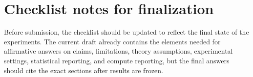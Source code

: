 \documentclass{article}
\begin{document}
\section{Checklist notes for finalization}
\label{app:checklist-notes}

Before submission, the checklist should be updated to reflect the final state of the experiments.
The current draft already contains the elements needed for affirmative answers on claims, limitations, theory assumptions, experimental settings, statistical reporting, and compute reporting, but the final answers should cite the exact sections after results are frozen.

\newpage

\end{document}
